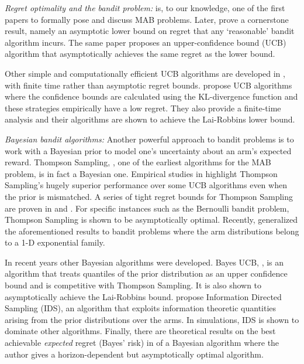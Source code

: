 \noindent\emph{Regret optimality and the bandit problem: }\cite{robbins1952some} is, to our knowledge, one of the first papers to formally pose and discuss MAB problems. Later, \cite{lai1985asymptotically} prove a cornerstone result, namely an asymptotic lower bound on regret that any `reasonable' bandit algorithm incurs. The same paper proposes an upper-confidence bound (UCB) algorithm that asymptotically achieves the same regret as the lower bound.


Other simple and  computationally efficient UCB algorithms are developed in \cite{agrawal1995sample,auer2002finite,audibert2010regret}, with finite time rather than asymptotic regret bounds. \cite{garivier2011kl,maillard2011finite} propose UCB algorithms where the confidence bounds are calculated using the KL-divergence function and these strategies empirically have a low regret. They also provide a finite-time analysis and their algorithms are shown to achieve the Lai-Robbins lower bound.

\noindent\emph{Bayesian bandit algorithms: } Another powerful approach to bandit problems is to work with a Bayesian prior to model one's uncertainty about an arm's expected reward. 
Thompson Sampling, \cite{thompson1933likelihood}, one of the earliest algorithms for the MAB problem, is in fact a Bayesian one. Empirical studies in \cite{chapelle2011empirical,scott2010modern} highlight Thompson Sampling's hugely superior performance over some UCB algorithms even when the prior is mismatched. A series of tight regret bounds for Thompson Sampling are proven in \cite{agrawalanalysis,agrawal2013further} and \cite{kaufmann2012thompson}. For specific instances such as the Bernoulli bandit problem, Thompson Sampling is shown to be asymptotically optimal. Recently, \cite{korda2013thompson} generalized the aforementioned results to bandit problems where the arm distributions belong to a 1-D exponential family.

In recent years other Bayesian algorithms were developed. Bayes UCB, \cite{kaufmann2012thompson}, is an algorithm that treats quantiles of the prior distribution as an upper confidence bound and is competitive with Thompson Sampling. It is also shown to asymptotically achieve the Lai-Robbins bound. \cite{russo2014learning} propose Information Directed Sampling (IDS), an algorithm that exploits information theoretic quantities arising from the prior distributions over the arms. In simulations, IDS is shown to dominate other algorithms. Finally, there are theoretical results on the best achievable \emph{expected} regret (Bayes' risk) in \cite{lai1987adaptive} of a Bayesian algorithm where the author gives a horizon-dependent but asymptotically optimal algorithm.

